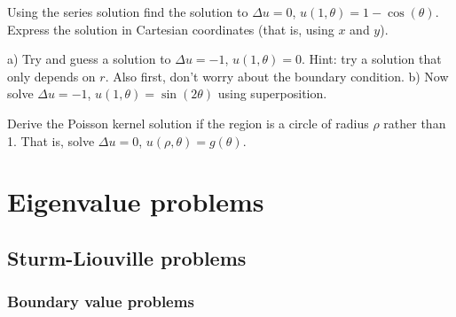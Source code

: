 \documentclass[12pt]{book}
\begin{document}
\begin{exercise}
Using the series solution find the solution to
$\Delta u = 0$, $u(1,\theta) = 1- \cos(\theta)$.  Express the solution
in Cartesian coordinates (that is, using $x$ and $y$).
\end{exercise}

\begin{exercise}
a) Try and guess a solution to $\Delta u = -1$, $u(1,\theta) = 0$.
Hint: try a solution that only depends on $r$.  Also first, don't worry
about the boundary condition.
b) Now solve $\Delta u = -1$, $u(1,\theta) = \sin(2\theta)$ using
superposition.
\end{exercise}

\begin{exercise}[challenging]
Derive the Poisson kernel solution
if the region is a circle of radius $\rho$ rather
than 1.  That is, solve $\Delta u = 0$, $u(\rho,\theta) = g(\theta)$.
\end{exercise}



\chapter{Eigenvalue problems} \label{SL:chapter}


\section{Sturm-Liouville problems}


\subsection{Boundary value problems}
\end{document}
